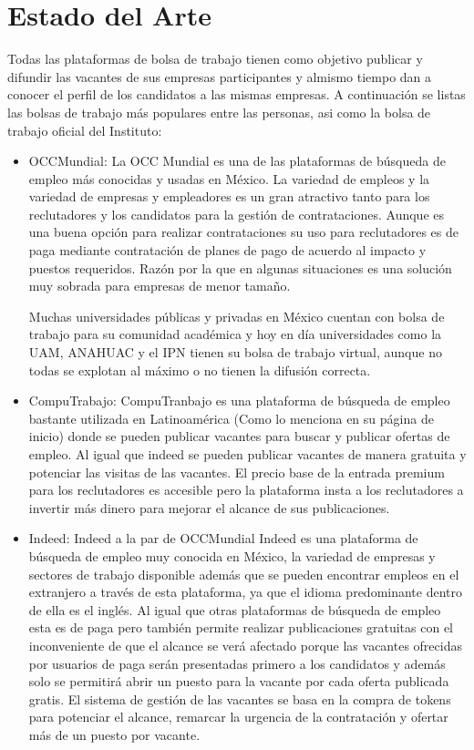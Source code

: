\section{Estado del Arte}
Todas las plataformas de bolsa de trabajo tienen como objetivo publicar y difundir las vacantes de sus empresas participantes
y almismo tiempo dan a conocer el perfil de los candidatos a las mismas empresas.
\newline
A continuación se listas las bolsas de trabajo más populares entre las personas, asi como  la bolsa de trabajo
oficial del Instituto:
\begin{itemize}
    \item OCCMundial: La OCC Mundial es una de las plataformas de búsqueda de empleo más conocidas y usadas en México. La variedad 
    de empleos y la variedad de empresas y empleadores es un gran atractivo tanto para los reclutadores y los candidatos para la 
    gestión de contrataciones. Aunque es una buena opción para realizar contrataciones su uso para reclutadores es de paga mediante 
    contratación de planes de pago de acuerdo al impacto y puestos requeridos. Razón por la que en algunas situaciones es una 
    solución muy sobrada para empresas de menor tamaño.

    Muchas universidades públicas y privadas en México cuentan con bolsa de trabajo para su comunidad académica y hoy en día 
    universidades como la UAM, ANAHUAC y el IPN tienen su bolsa de trabajo virtual, aunque no todas se explotan al máximo o no 
    tienen la difusión correcta.
    
    \item CompuTrabajo: CompuTranbajo es una plataforma de búsqueda de empleo bastante utilizada en Latinoamérica (Como lo menciona 
    en su página de inicio) donde se pueden publicar vacantes para buscar y publicar ofertas de empleo. Al igual que indeed se 
    pueden publicar vacantes de manera gratuita y potenciar las visitas de las vacantes. El precio base de la entrada premium para 
    los reclutadores es accesible pero la plataforma insta a los reclutadores a invertir más dinero para mejorar el alcance de sus 
    publicaciones.
    
    \item Indeed: Indeed a la par de OCCMundial Indeed es una plataforma de búsqueda de empleo muy conocida en México, la variedad 
    de empresas y sectores de trabajo disponible además que se pueden encontrar empleos en el extranjero a través de esta 
    plataforma, ya que el idioma predominante dentro de ella es el inglés. Al igual que otras plataformas de búsqueda de empleo 
    esta es de paga pero también permite realizar publicaciones gratuitas con el inconveniente de que el alcance se verá afectado 
    porque las vacantes ofrecidas por usuarios de paga serán presentadas primero a los candidatos y además solo se permitirá abrir 
    un puesto para la vacante por cada oferta publicada gratis. El sistema de gestión de las vacantes se basa en la compra de 
    tokens para potenciar el alcance, remarcar la urgencia de la contratación y ofertar más de un puesto por vacante.
    

\end{itemize}
